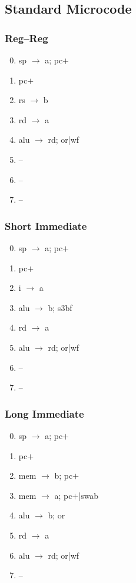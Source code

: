 \documentclass[11pt]{book}
\begin{document}
\subsection*{Standard Microcode}
\begin{multicols}{3}\ttfamily\selectfont\small
  \subsubsection*{Reg--Reg}
  \begin{enumerate}\setcounter{enumi}{-1}
  \item sp \(\rightarrow\) a; pc\(+\)
  \item pc\(+\)
  \item rs \(\rightarrow\) b
  \item rd \(\rightarrow\) a
  \item alu \(\rightarrow\) rd; or|wf
  \item --
  \item --
  \item --
  \end{enumerate}
  \columnbreak
  \subsubsection*{Short Immediate}
  \begin{enumerate}\setcounter{enumi}{-1}
  \item sp \(\rightarrow\) a; pc\(+\)
  \item pc\(+\)
  \item i \(\rightarrow\) a
  \item alu \(\rightarrow\) b; s3bf
  \item rd \(\rightarrow\) a
  \item alu \(\rightarrow\) rd; or|wf
  \item --
  \item --
  \end{enumerate}
  \columnbreak
  \subsubsection*{Long Immediate}
  \begin{enumerate}\setcounter{enumi}{-1}
  \item sp \(\rightarrow\) a; pc\(+\)
  \item pc\(+\)
  \item mem \(\rightarrow\) b; pc\(+\)
  \item mem \(\rightarrow\) a; pc\(+\)|swab
  \item alu \(\rightarrow\) b; or
  \item rd \(\rightarrow\) a
  \item alu \(\rightarrow\) rd; or|wf
  \item --
  \end{enumerate}
\end{multicols}
\end{document}
